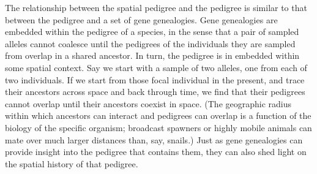 \documentclass{ar-1col}
\begin{document}
The relationship between the spatial pedigree and the pedigree
is similar to that between the pedigree and a set of gene genealogies.
Gene genealogies are embedded within the pedigree of a species,
in the sense that a pair of sampled alleles cannot coalesce until
the pedigrees of the individuals they are sampled from overlap in a shared ancestor.
In turn, the pedigree is in embedded within some spatial context.
Say we start with a sample of two alleles, one from each of two individuals.
If we start from those focal individual in the present,
and trace their ancestors across space and back through time,
we find that their pedigrees cannot overlap until their ancestors coexist in space.
(The geographic radius within which ancestors can interact
and pedigrees can overlap is a function of the biology of the specific organism;
broadcast spawners or highly mobile animals can mate over much larger distances than, say, snails.)
Just as gene genealogies can provide insight into the pedigree that contains them,
they can also shed light on the spatial history of that pedigree.
\end{document}
